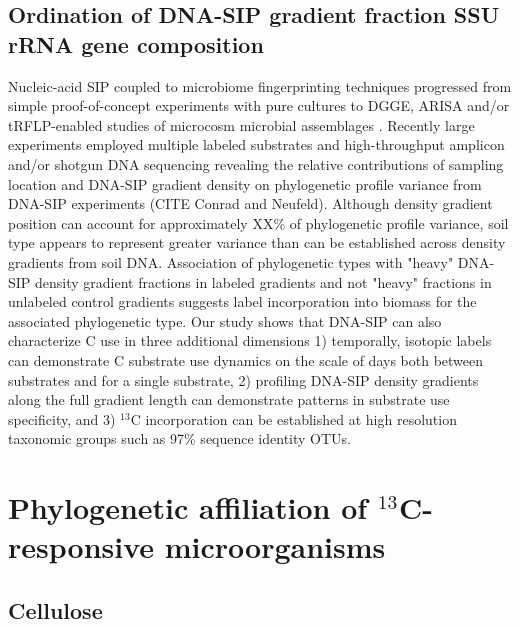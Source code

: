 \documentclass{article}
\begin{document}
\subsection{Ordination of DNA-SIP gradient fraction SSU rRNA gene composition}\label{ord}
Nucleic-acid SIP coupled to microbiome fingerprinting techniques progressed
from simple proof-of-concept experiments with pure cultures
\citep{radajewski2000stable} to DGGE, ARISA and/or tRFLP-enabled studies of
microcosm microbial assemblages \citep{Haichar_2007}. Recently large
experiments employed multiple labeled substrates and high-throughput amplicon
and/or shotgun DNA sequencing \citep{Verastegui_2014} revealing the relative
contributions of sampling location and DNA-SIP gradient density on phylogenetic
profile variance from DNA-SIP experiments (CITE Conrad and Neufeld). Although
density gradient position can account for approximately XX\% of phylogenetic
profile variance, soil type appears to represent greater variance than can be
established across density gradients from soil DNA. Association of phylogenetic
types with "heavy" DNA-SIP density gradient fractions in labeled gradients and
not "heavy" fractions in unlabeled control gradients suggests label
incorporation into biomass for the associated phylogenetic type. Our study
shows that DNA-SIP can also characterize C use in three additional 
dimensions 1) temporally, isotopic labels can demonstrate C substrate use
dynamics on the scale of days both between substrates and for a single
substrate, 2) profiling DNA-SIP density gradients along the full gradient
length can demonstrate patterns in substrate use specificity, and 3) $^{13}$C
incorporation can be established at high resolution taxonomic groups such
as 97\% sequence identity OTUs.

\section{Phylogenetic affiliation of $^{13}$C-responsive microorganisms}
\subsection{Cellulose}
\end{document}
